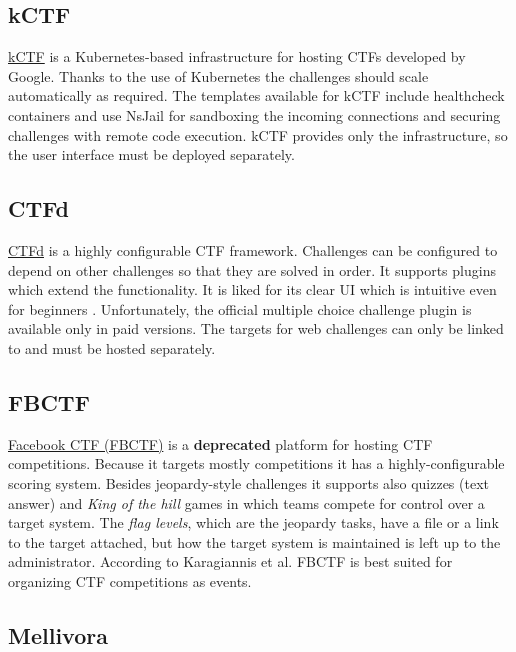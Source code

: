 \subsection{kCTF}

\href{https://github.com/google/kctf}{kCTF} is a Kubernetes-based infrastructure for hosting CTFs developed by Google. Thanks to the use of Kubernetes the challenges should scale automatically as required. The templates available for kCTF include healthcheck containers and use NsJail for sandboxing the incoming connections and securing challenges with remote code execution. kCTF provides only the infrastructure, so the user interface must be deployed separately.

\subsection{CTFd}
\label{ssec:CTFd}

\href{https://github.com/CTFd/CTFd}{CTFd} is a highly configurable CTF framework. Challenges can be configured to depend on other challenges so that they are solved in order. It supports plugins which extend the functionality. It is liked for its clear UI which is intuitive even for beginners \cite{bib:CTF-analysis, bib:bangladesh-CTFd}. Unfortunately, the official multiple choice challenge plugin is available only in paid versions. The targets for web challenges can only be linked to and must be hosted separately.

\subsection{FBCTF}
\label{ssec:FBCTF}

\href{https://github.com/facebookarchive/fbctf}{Facebook CTF (FBCTF)} is a \textbf{deprecated} platform for hosting CTF competitions. Because it targets mostly competitions it has a highly-configurable scoring system. Besides jeopardy-style challenges it supports also quizzes (text answer) and \textit{King of the hill} games in which teams compete for control over a target system. The \textit{flag levels}, which are the jeopardy tasks, have a file or a link to the target attached, but how the target system is maintained is left up to the administrator. According to Karagiannis et al. \cite{bib:CTF-analysis} FBCTF is best suited for organizing CTF competitions as events.

\subsection{Mellivora}

